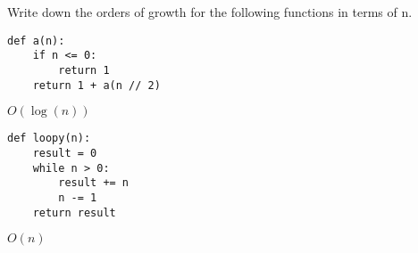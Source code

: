 \documentclass{exam}
\begin{document}
\begin{questions}


\begin{blocksection}
\question Write down the orders of growth for the following functions in terms of n. 

\begin{lstlisting}
def a(n):
    if n <= 0:
        return 1
    return 1 + a(n // 2)
\end{lstlisting}

\begin{solution}[0.5in]
$O(\log(n))$
\end{solution}

\begin{lstlisting}
def loopy(n):
    result = 0
    while n > 0:
        result += n
        n -= 1
    return result
\end{lstlisting}

\begin{solution}[0.5in]
$O(n)$
\end{solution}

\end{blocksection}
\end{questions}
\end{document}
